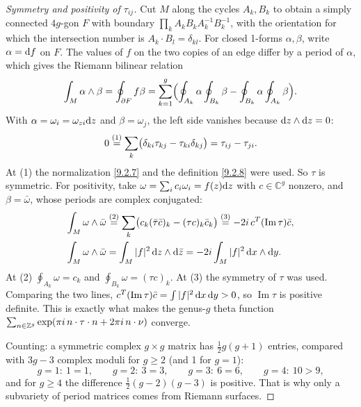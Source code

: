 \begin{tcolorbox}[breakable]
	\begin{proof}[Symmetry and positivity of $\tau_{ij}$]
		Cut $M$ along the cycles $A_k,B_k$ to obtain a simply connected $4g$-gon $F$ with boundary $\prod_kA_kB_kA_k^{-1}B_k^{-1}$, with the orientation for which the intersection number is $A_k\cdot B_l=\delta_{kl}$. For closed 1-forms $\alpha,\beta$, write $\alpha=\mathrm{d} f$ on $F$. The values of $f$ on the two copies of an edge differ by a period of $\alpha$, which gives the Riemann bilinear relation
		\begin{equation*}
			\int_M\alpha\wedge\beta=\oint_{\partial F}f\beta=\sum_{k=1}^g\Bigl(\oint_{A_k}\alpha\oint_{B_k}\beta-\oint_{B_k}\alpha\oint_{A_k}\beta\Bigr).
		\end{equation*}
		With $\alpha=\omega_i=\omega_{zi}\mathrm{d} z$ and $\beta=\omega_j$, the left side vanishes because $\mathrm{d} z\wedge\mathrm{d} z=0$:
		\begin{equation*}
			0\overset{(1)}{=}\sum_k\bigl(\delta_{ki}\tau_{kj}-\tau_{ki}\delta_{kj}\bigr)=\tau_{ij}-\tau_{ji} .
		\end{equation*}
		At (1) the normalization \eqref{9.2.7} and the definition \eqref{9.2.8} were used. So $\tau$ is symmetric. For positivity, take $\omega=\sum_ic_i\omega_i=f(z)\mathrm{d} z$ with $c\in\mathbb C^g$ nonzero, and $\beta=\bar\omega$, whose periods are complex conjugated:
		\begin{align*}
			\int_M\omega\wedge\bar\omega&\overset{(2)}{=}\sum_k\bigl(c_k(\bar\tau\bar c)_k-(\tau c)_k\bar c_k\bigr)\overset{(3)}{=}-2i\,c^T(\operatorname{Im}\tau)\bar c ,\\
			\int_M\omega\wedge\bar\omega&=\int_M|f|^2\,\mathrm{d} z\wedge\mathrm{d}\bar z=-2i\int_M|f|^2\,\mathrm{d} x\wedge\mathrm{d} y .
		\end{align*}
		At (2) $\oint_{A_k}\omega=c_k$ and $\oint_{B_k}\omega=(\tau c)_k$. At (3) the symmetry of $\tau$ was used. Comparing the two lines, $c^T(\operatorname{Im}\tau)\bar c=\int|f|^2\,\mathrm{d} x\,\mathrm{d} y>0$, so $\operatorname{Im}\tau$ is positive definite. This is exactly what makes the genus-$g$ theta function $\sum_{n\in\mathbb Z^g}\exp(\pi i\,n\cdot\tau\cdot n+2\pi i\,n\cdot\nu)$ converge.

		Counting: a symmetric complex $g\times g$ matrix has $\frac12g(g+1)$ entries, compared with $3g-3$ complex moduli for $g\ge2$ (and 1 for $g=1$):
		\begin{equation*}
			g=1:\ 1=1,\qquad g=2:\ 3=3,\qquad g=3:\ 6=6,\qquad g=4:\ 10>9,
		\end{equation*}
		and for $g\ge4$ the difference $\frac12(g-2)(g-3)$ is positive. That is why only a subvariety of period matrices comes from Riemann surfaces.
	\end{proof}
\end{tcolorbox}


